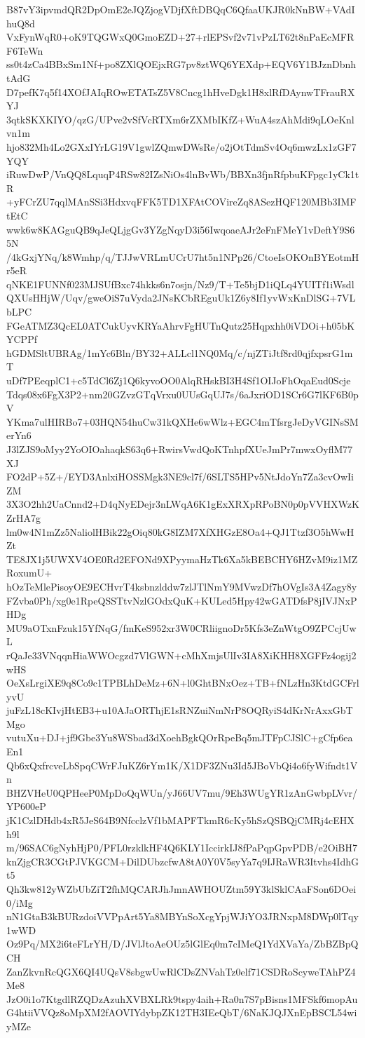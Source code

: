 B87vY3ipvmdQR2DpOmE2eJQZjogVDjfXftDBQqC6QfaaUKJR0kNnBW+VAdIhuQ8d
VxFynWqR0+oK9TQGWxQ0GmoEZD+27+rlEPSvf2v71vPzLT62t8nPaEcMFRF6TeWn
ss0t4zCa4BBxSm1Nf+po8ZXlQOEjxRG7pv8ztWQ6YEXdp+EQV6Y1BJznDbnhtAdG
D7pefK7q5f14XOfJAIqROwETATsZ5V8Cncg1hHveDgk1H8xlRfDAynwTFrauRXYJ
3qtkSKXKIYO/qzG/UPve2vSfVcRTXm6rZXMbIKfZ+WuA4szAhMdi9qLOeKnlvn1m
hjo832Mh4Lo2GXxIYrLG19V1gwlZQmwDWsRe/o2jOtTdmSv4Oq6mwzLx1zGF7YQY
iRuwDwP/VnQQ8LquqP4RSw82IZsNiOs4lnBvWb/BBXn3fjnRfpbuKFpgc1yCk1tR
+yFCrZU7qqlMAnSSi3HdxvqFFK5TD1XFAtCOVireZq8ASezHQF120MBb3IMFtEtC
wwk6w8KAGguQB9qJeQLjgGv3YZgNqyD3i56IwqoaeAJr2eFnFMeY1vDeftY9S65N
/4kGxjYNq/k8Wmhp/q/TJJwVRLmUCrU7ht5n1NPp26/CtoeIsOKOnBYEotmHr5eR
qNKE1FUNNf023MJSUfBxc74hkks6n7osjn/Nz9/T+Te5bjD1iQLq4YUITf1iWsdl
QXUsHHjW/Uqv/gweOiS7uVyda2JNsKCbREguUk1Z6y8If1yvWxKnDlSG+7VLbLPC
FGeATMZ3QcEL0ATCukUyvKRYaAhrvFgHUTnQutz25Hqpxhh0iVDOi+h05bKYCPPf
hGDMSltUBRAg/1mYc6Bln/BY32+ALLcl1NQ0Mq/c/njZTiJtf8rd0qjfxpsrG1mT
uDf7PEeqplC1+c5TdCl6Zj1Q6kyvoOO0AlqRHskBI3H4Sf1OIJoFhOqaEud0Scje
Tdqs08x6FgX3P2+nm20GZvzGTqVrxu0UUsGqUJ7s/6aJxriOD1SCr6G7lKF6B0pV
YKma7ulHIRBo7+03HQN54huCw31kQXHe6wWlz+EGC4mTfsrgJeDyVGINsSMerYn6
J3lZJS9oMyy2YoOIOahaqkS63q6+RwirsVwdQoKTnhpfXUeJmPr7mwxOyflM77XJ
FO2dP+5Z+/EYD3AnlxiHOSSMgk3NE9cl7f/6SLTS5HPv5NtJdoYn7Za3cvOwIiZM
3X3O2hh2UaCnnd2+D4qNyEDejr3nLWqA6K1gExXRXpRPoBN0p0pVVHXWzKZrHA7g
lm0w4N1mZz5NaliolHBik22gOiq80kG8IZM7XfXHGzE8Oa4+QJ1Ttzf3O5hWwHZt
TE8JX1j5UWXV4OE0Rd2EFONd9XPyymaHzTk6Xa5kBEBCHY6HZvM9iz1MZRoxumU+
hOzTeMlePisoyOE9ECHvrT4ksbnzlddw7zlJTlNmY9MVwzDf7hOVgIs3A4Zagy8y
FZvba0Ph/xg0e1RpeQSSTtvNzlGOdxQuK+KULed5Hpy42wGATDfsP8jIVJNxPHDg
MU9aOTxnFzuk15YfNqG/fmKeS952xr3W0CRliignoDr5Kfs3eZnWtgO9ZPCcjUwL
rQaJe33VNqqnHiaWWOcgzd7VlGWN+cMhXmjsUlIv3IA8XiKHH8XGFFz4ogij2wHS
OeXsLrgiXE9q8Co9c1TPBLhDeMz+6N+l0GhtBNxOez+TB+fNLzHn3KtdGCFrlyvU
juFzL18cKIvjHtEB3+u10AJaORThjE1sRNZuiNmNrP8OQRyiS4dKrNrAxxGbTMgo
vutuXu+DJ+jf9Gbe3Yu8WSbad3dXoehBgkQOrRpeBq5mJTFpCJSlC+gCfp6eaEn1
Qb6xQxfrcveLbSpqCWrFJuKZ6rYm1K/X1DF3ZNu3Id5JBoVbQi4o6fyWifndt1Vn
BHZVHeU0QPHeeP0MpDoQqWUn/yJ66UV7mu/9Eh3WUgYR1zAnGwbpLVvr/YP600eP
jK1CzlDHdb4xR5JeS64B9NfcclzVf1bMAPFTkmR6cKy5hSzQSBQjCMRj4cEHXh9l
m/96SAC6gNyhHjP0/PFL0rzklkHF4Q6KLY1IccirkIJ8fPaPqpGpvPDB/e2OiBH7
knZjgCR3CGtPJVKGCM+DilDUbzcfwA8tA0Y0V5syYa7q9IJRaWR3Itvhs4IdhGt5
Qh3kw812yWZbUbZiT2fhMQCARJhJmnAWHOUZtm59Y3klSklCAaFSon6DOei0/iMg
nN1GtaB3kBURzdoiVVPpArt5Ya8MBYnSoXcgYpjWJiYO3JRNxpM8DWp0lTqy1wWD
Oz9Pq/MX2i6teFLrYH/D/JVlJtoAeOUz5lGlEq0m7cIMeQ1YdXVaYa/ZbBZBpQCH
ZanZkvnRcQGX6QI4UQsV8sbgwUwRlCDsZNVahTz0elf71CSDRoScyweTAhPZ4Me8
JzO0i1o7KtgdlRZQDzAzuhXVBXLRk9tspy4aih+Ra0n7S7pBisns1MFSkf6mopAu
G4htiiVVQz8oMpXM2fAOVIYdybpZK12TH3IEeQbT/6NaKJQJXnEpBSCL54wiyMZe
